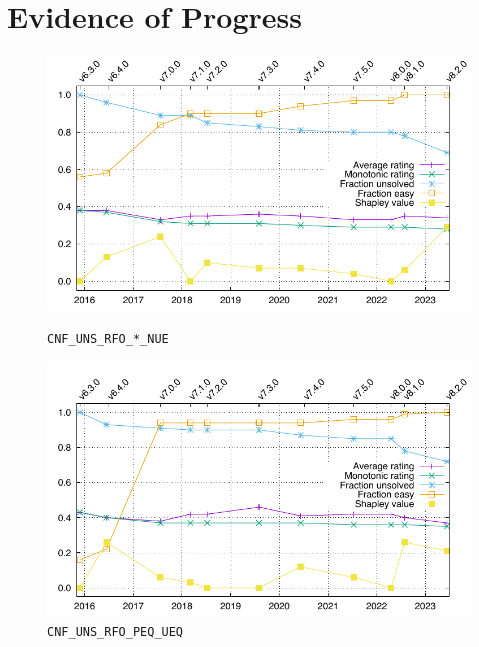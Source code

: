 \documentclass[runningheads]{llncs}
\begin{document}
\section{Evidence of Progress}
\label{Evidence}

\begin{figure}[ht!]
\centering
\begin{minipage}[t]{.49\textwidth}
  \centering
  \includegraphics[width=\textwidth]{Plots/GNUPlots/CNF_UNS_RFO_NUE.pdf}
  \vspace*{-2em}
  \caption{{\tt CNF\_UNS\_RFO\_*\_NUE}}
  \label{Plot_CNF_UNS}
\end{minipage}
\begin{minipage}[t]{.49\textwidth}
  \centering
  \includegraphics[width=\textwidth]{Plots/GNUPlots/CNF_UNS_RFO_PEQ_UEQ.pdf}
  \vspace*{-2em}
  \caption{{\tt CNF\_UNS\_RFO\_PEQ\_UEQ}}
  \label{Plot_CNF_UEQ}
\end{minipage}
\end{figure}
\end{document}
